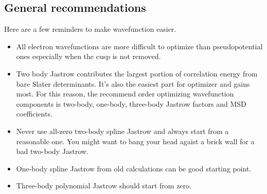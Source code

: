 \subsection{General recommendations}
Here are a few reminders to make wavefunction easier.
\begin{itemize}
\item All electron wavefunctions are more difficult to optimize than pseudopotential ones especially when the cusp is not removed.
\item Two body Jastrow contributes the largest portion of correlation energy from bare Slater determinants. It's also the easiest part for optimizer and gains most. For this reason, the recommend order optimizing wavefunction components is two-body, one-body, three-body Jastrow factors and MSD coefficients.
\item Never use all-zero two-body spline Jastrow and always start from a reasonable one. 
      You might want to bang your head agaist a brick wall for a bad two-body Jastrow.
\item One-body spline Jastrow from old calculations can be good starting point.
\item Three-body polynomial Jastrow should start from zero.
\end{itemize}

\label{sec:optimization}

